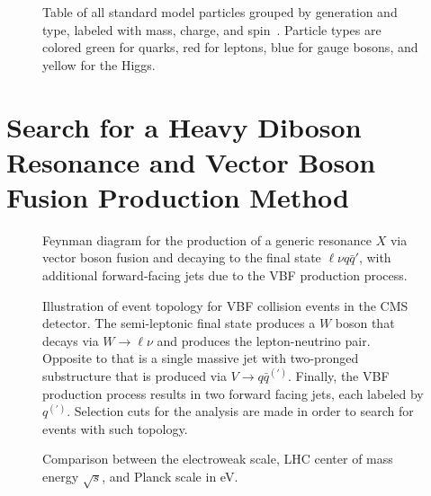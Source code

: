 
\begin{figure}[htbp]
  \centering
  
  \caption{Table of all standard model particles grouped by generation and type, labeled with mass, charge, and spin~\cite{PhysRevD.98.030001}. Particle types are colored green for quarks, red for leptons, blue for gauge bosons, and yellow for the Higgs.}
  \label{fig:standardModel}
\end{figure}

\section{Search for a Heavy Diboson Resonance and Vector Boson Fusion Production Method}
\label{sec:VBF}

\begin{figure}[htbp]
  \centering
  
  \caption{Feynman diagram for the production of a generic resonance $X$ via vector boson fusion and decaying to the final state $\ell\nu q\bar{q}'$, with additional forward-facing jets due to the VBF production process.}
  \label{fig:vbfFeynman}
\end{figure}

\begin{figure}[htbp]
  \centering
  
  \caption{Illustration of event topology for VBF collision events in the CMS detector. The semi-leptonic final state produces a $W$ boson that decays via $W\to\ell\nu$ and produces the lepton-neutrino pair. Opposite to that is a single massive jet with two-pronged substructure that is produced via $V\to q\bar{q}^{(\prime)}$. Finally, the VBF production process results in two forward facing jets, each labeled by $q^{(\prime)}$. Selection cuts for the analysis are made in order to search for events with such topology.}
  \label{fig:eventTop}
\end{figure}

\begin{figure}[htbp]
  \centering
  
  \caption{Comparison between the electroweak scale, LHC center of mass energy $\sqrt{s}$, and Planck scale in eV.}
  \label{fig:hierarchy}
\end{figure}

\begin{figure}[htbp]
  \centering
  
  \caption{}
  \label{fig:hierarchy}
\end{figure}

\begin{figure}[htbp]
  \centering
  
  \caption{}
  \label{fig:hierarchy}
\end{figure}
